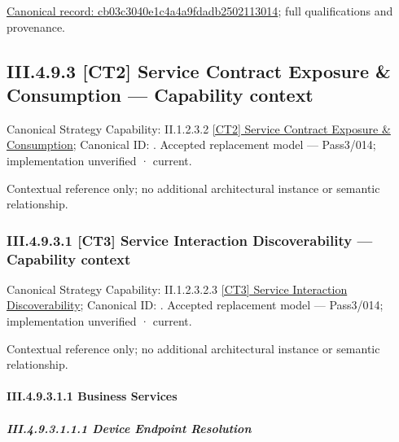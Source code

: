 {\footnotesize \href{../../../../../../../continuum/business/business-function/cb03c3040e1c4a4a9fdadb2502113014.md}{Canonical record: cb03c3040e1c4a4a9fdadb2502113014}; full qualifications and provenance.}\par
\subsection*{III.4.9.3 [CT2] Service Contract Exposure \& Consumption — Capability context}
\label{navigation:III.4.9.3}

{\small Canonical Strategy Capability: II.1.2.3.2 \hyperref[element:bee33783461e4d1bb0cd354c1fb8560e]{[CT2] Service Contract Exposure \& Consumption}; Canonical ID: \texttt{}. Accepted replacement model — Pass3/014; implementation unverified · current.}\par
Contextual reference only; no additional architectural instance or semantic relationship.\par
\subsubsection*{III.4.9.3.1 [CT3] Service Interaction Discoverability — Capability context}
\label{navigation:III.4.9.3.1}

{\small Canonical Strategy Capability: II.1.2.3.2.3 \hyperref[element:84a28d9f09684d3ba6446d0f7d6cdf7f]{[CT3] Service Interaction Discoverability}; Canonical ID: \texttt{}. Accepted replacement model — Pass3/014; implementation unverified · current.}\par
Contextual reference only; no additional architectural instance or semantic relationship.\par
\paragraph*{III.4.9.3.1.1 Business Services}
\label{navigation:III.4.9.3.1.1}

\subparagraph*{III.4.9.3.1.1.1 Device Endpoint Resolution}
\label{navigation:III.4.9.3.1.1.1}

